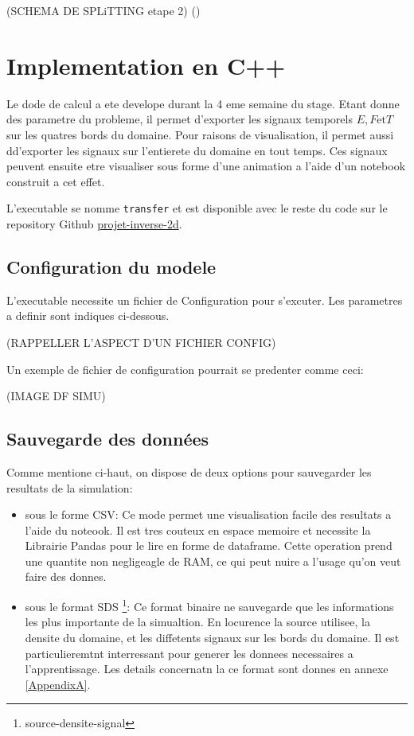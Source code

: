 (SCHEMA DE SPLiTTING etape 2) (\parencite{Reference4})


\section{Implementation en C++}

Le dode de calcul a ete develope durant la 4 eme semaine du stage. Etant donne des parametre du probleme, il permet d'exporter les signaux temporels $E, F \text{et} T$ sur les quatres bords du domaine. Pour raisons de visualisation, il permet aussi dd'exporter les signaux sur l'entierete du domaine en tout temps. Ces signaux peuvent ensuite etre visualiser sous forme d'une animation a l'aide d'un notebook construit a cet effet.

L'executable se nomme \verb|transfer| et est disponible avec le reste du code sur le repository Github \href{https://github.com/desmond-rn/projet-inverse-2d}{projet-inverse-2d}.

\subsection{Configuration du modele}

L'executable necessite un fichier de Configuration pour s'excuter. Les parametres a definir sont indiques ci-dessous.

(RAPPELLER L'ASPECT D'UN FICHIER CONFIG)

Un exemple de fichier de configuration pourrait se predenter comme ceci:

(IMAGE DF SIMU)


\subsection{Sauvegarde des données}

Comme mentione ci-haut, on dispose de deux options pour sauvegarder les resultats de la simulation:

\begin{itemize}
 \item sous le forme CSV: Ce mode permet une visualisation facile des resultats a l'aide du noteook. Il est tres couteux en espace memoire et necessite la Librairie Pandas pour le lire en forme de dataframe. Cette operation prend une quantite non negligeagle de RAM, ce qui peut nuire a l'usage qu'on veut faire des donnes.
 
 \item sous le format SDS \footnote{source-densite-signal}: Ce format binaire ne sauvegarde que les informations les plus importante de la simualtion. En locurence la source utilisee, la densite du domaine, et les diffetents signaux sur les bords du domaine. Il est particulieremtnt interressant pour generer les donnees necessaires a l'apprentissage. Les details concernatn la ce format sont donnes en annexe \ref{AppendixA}.
\end{itemize}

